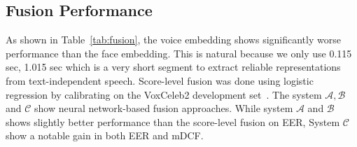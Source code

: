 \documentclass{article}
\begin{document}
\subsection{Fusion Performance}\label{sec:exp_fusion}
As shown in Table~\ref{tab:fusion}, the voice embedding shows significantly worse performance than the face embedding. This is natural because we only use 0.115 sec, 1.015 sec which is a very short segment to extract reliable representations from text-independent speech.  Score-level fusion was done using logistic regression by calibrating on the VoxCeleb2 development set~\cite{Brummer2006}. The system $\mathcal{A, B}$ and $\mathcal{C}$ show neural network-based fusion approaches. While system $\mathcal{A}$ and $\mathcal{B}$ shows slightly better performance than the score-level fusion on EER, System $\mathcal{C}$ show a notable gain in both EER and mDCF.
\end{document}
